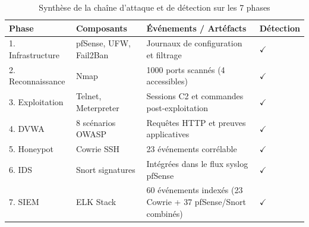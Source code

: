 \documentclass[12pt,a4paper,openany]{report}
\newcommand{\tableheadcolor}{\rowcolor{tableheadbg}}
\begin{document}
	\begin{table}[H]
		\centering
		\small
		\renewcommand{\arraystretch}{1.25}
		\setlength{\arrayrulewidth}{0.5pt}
		\begin{tabular}{p{2.2cm} p{3.7cm} p{4.3cm} >{\centering\arraybackslash}p{1.7cm}}
			\arrayrulecolor{tableborder}
			\hline
			\tableheadcolor
			\textcolor{tableheadfg}{\textbf{Phase}} &
			\textcolor{tableheadfg}{\textbf{Composants}} &
			\textcolor{tableheadfg}{\textbf{Événements / Artéfacts}} &
			\textcolor{tableheadfg}{\textbf{Détection}} \\
			\hline
			\rowcolor{tablerowalt}
			1. Infrastructure & pfSense, UFW, Fail2Ban & Journaux de configuration et filtrage & $\checkmark$ \\
			2. Reconnaissance & Nmap & 1000 ports scannés (4 accessibles) & $\checkmark$ \\
			\rowcolor{tablerowalt}
			3. Exploitation & Telnet, Meterpreter & Sessions C2 et commandes post-exploitation & $\checkmark$ \\
			4. DVWA & 8 scénarios OWASP & Requêtes HTTP et preuves applicatives & $\checkmark$ \\
			\rowcolor{tablerowalt}
			5. Honeypot & Cowrie SSH & 23 événements corrélable & $\checkmark$ \\
			6. IDS & Snort signatures & Intégrées dans le flux syslog pfSense & $\checkmark$ \\
			\rowcolor{tablerowalt}
			7. SIEM & ELK Stack & 60 événements indexés (23 Cowrie + 37 pfSense/Snort combinés) & $\checkmark$ \\
			\hline
		\end{tabular}
		\caption{Synthèse de la chaîne d'attaque et de détection sur les 7 phases}
		\label{tab:conclusion-attack-chain-summary}
	\end{table}
	
\end{document}
